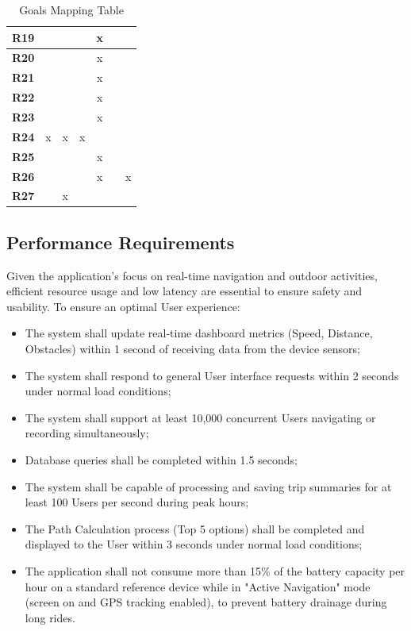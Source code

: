 \begin{table}[H]
\begin{tabular}{|c|c|c|c|c|c|c|}
        \textbf{R19} &   &   &   & x &   &   \\ \hline
        \textbf{R20} &   &   &   & x &   &   \\ \hline
        \textbf{R21} &   &   &   & x &   &   \\ \hline
        \textbf{R22} &   &   &   & x &   &   \\ \hline
        \textbf{R23} &   &   &   & x &   &   \\ \hline
        \textbf{R24} & x & x & x &   &   &   \\ \hline
        \textbf{R25} &   &   &   & x &   &   \\ \hline
        \textbf{R26} &   &   &   & x &   & x \\ \hline
        \textbf{R27} &   & x &   &   &   &   \\ \hline
    \end{tabular}
    \caption{Goals Mapping Table}
    \label{tab:requirements_mapping_final}
\end{table}

\newpage

\subsection{Performance Requirements}

Given the application's focus on real-time navigation and outdoor activities, efficient resource usage and low latency are essential to ensure safety and usability. To ensure an optimal User experience:

\begin{itemize}
    \item The system shall update real-time dashboard metrics (Speed, Distance, Obstacles) within 1 second of receiving data from the device sensors;
    \item The system shall respond to general User interface requests within 2 seconds under normal load conditions;
    \item The system shall support at least 10,000 concurrent Users navigating or recording simultaneously;
    \item Database queries shall be completed within 1.5 seconds;
    \item The system shall be capable of processing and saving trip summaries for at least 100 Users per second during peak hours;
    \item The Path Calculation process (Top 5 options) shall be completed and displayed to the User within 3 seconds under normal load conditions;
    \item The application shall not consume more than 15\% of the battery capacity per hour on a standard reference device while in "Active Navigation" mode (screen on and GPS tracking enabled), to prevent battery drainage during long rides.
\end{itemize}

